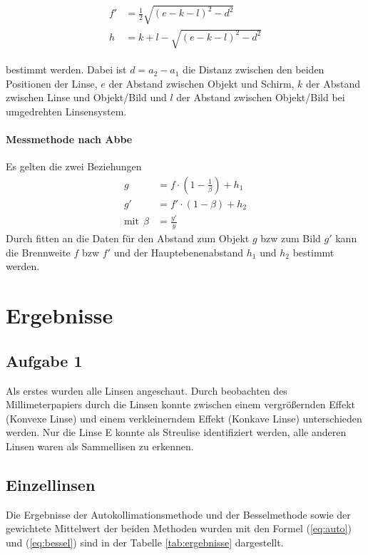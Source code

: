 \documentclass[11pt, a4paper]{article}
\begin{document}
    \begin{align} \begin{split} \label{eq:dicke}
        f' &= \frac{1}{2} \sqrt{(e-k-l)^2 - d^2} \\
        h &= k + l - \sqrt{(e-k-l)^2 - d^2} \end{split}
    \end{align}
        
    bestimmt werden. Dabei ist $d = a_2 - a_1$ die Distanz zwischen den beiden Positionen der Linse, $e$ der Abstand zwischen Objekt und Schirm, $k$ der Abstand zwischen Linse und Objekt/Bild und $l$ der Abstand zwischen Objekt/Bild bei umgedrehten Linsensystem.

    \paragraph{Messmethode nach Abbe}
    Es gelten die zwei Beziehungen
    \begin{align}
        g &= f \cdot \left(1 - \frac{1}{\beta}\right) + h_1 \label{eq:dicke1} \\
        g' &= f' \cdot (1 - \beta) + h_2 \label{eq:dicke2} \\
        \text{mit} \ \ \beta &= \frac{y'}{y}
    \end{align}
    Durch fitten an die Daten für den Abstand zum Objekt $g$ bzw zum Bild $g'$ kann die Brennweite $f$ bzw $f'$ und der Hauptebenenabstand $h_1$ und $h_2$ bestimmt werden.


    \section{Ergebnisse}
    \subsection{Aufgabe 1}
    Als erstes wurden alle Linsen angeschaut. Durch beobachten des Millimeterpapiers durch die Linsen konnte zwischen einem vergrößernden Effekt (Konvexe Linse) und einem verkleinerndem Effekt (Konkave Linse) unterschieden werden. Nur die Linse E konnte als Streulise identifiziert werden, alle anderen Linsen waren als Sammellisen zu erkennen.

    \subsection{Einzellinsen}
    Die Ergebnisse der Autokollimationsmethode und der Besselmethode sowie der gewichtete Mittelwert der beiden Methoden wurden mit den Formel (\ref{eq:auto}) und (\ref{eq:bessel}) sind in der Tabelle \ref{tab:ergebnisse} dargestellt.
\end{document}
